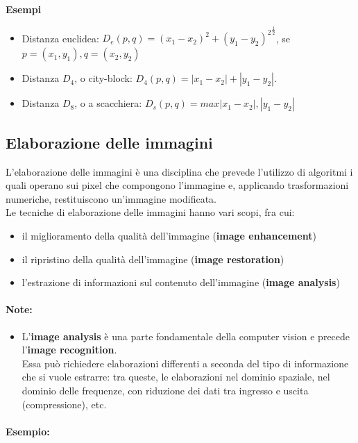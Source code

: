 \textbf{Esempi}

\begin{itemize}
    \item Distanza euclidea: $D_e(p, q) = {(x_1 - x_2)^2 + (y_1 - y_2)^2}^{\frac{1}{2}}$, se $p = (x_1, y_1), q=(x_2, y_2)$
    \item Distanza $D_4$, o city-block: $D_4(p, q) = |x_1 - x_2| + |y_1 - y_2|$.
    \item Distanza $D_8$, o a scacchiera: $D_s(p,q) = max{|x_1 - x_2|, |y_1 - y_2|}$
\end{itemize}


\subsection{Elaborazione delle immagini}
L'elaborazione delle immagini è una disciplina che prevede l'utilizzo
di algoritmi i quali operano sui pixel che compongono l'immagine
e, applicando trasformazioni numeriche, restituiscono un'immagine
modificata.\\
Le tecniche di elaborazione delle immagini hanno vari scopi, fra cui:

\begin{itemize}
    \item il miglioramento della qualità dell'immagine (\textbf{image enhancement})
    \item il ripristino della qualità dell'immagine (\textbf{image restoration})
    \item l'estrazione di informazioni sul contenuto dell'immagine (\textbf{image analysis})
\end{itemize}

\paragraph{Note:}

\begin{itemize}
    \item L'\textbf{image analysis} è una parte fondamentale della computer vision e
          precede l'\textbf{image recognition}.\\
          Essa può richiedere elaborazioni differenti a seconda del tipo di
          informazione che si vuole estrarre: tra queste, le elaborazioni nel
          dominio spaziale, nel dominio delle frequenze, con riduzione dei
          dati tra ingresso e uscita (compressione), etc.
\end{itemize}

\paragraph{Esempio:}

